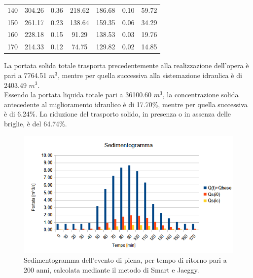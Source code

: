 \begin{table}[H]
\begin{tabular}{ccccccc}
    140      & 304.26                       & 0.36   & 218.62  & 186.68                       & 0.10   & 59.72  \\
    150      & 261.17                       & 0.23   & 138.64  & 159.35                       & 0.06   & 34.29  \\
    160      & 228.18                       & 0.15   & 91.29   & 138.53                       & 0.03   & 19.76  \\
    170      & 214.33                       & 0.12   & 74.75   & 129.82                       & 0.02   & 14.85 \\
    \bottomrule
    \end{tabular}
    \end{table}
La portata solida totale trasporta precedentemente alla realizzazione dell'opera è pari a 7764.51 $m^3$, mentre per quella successiva alla sistemazione idraulica è di 2403.49 $m^3$.\\
Essendo la portata liquida totale pari a 36100.60 $m^3$, la concentrazione solida antecedente al miglioramento idraulico è di 17.70\%, mentre per quella successiva è di 6.24\%. La riduzione del trasporto solido, in presenza o in assenza delle briglie, è del 64.74\%.\\
\begin{figure}[H] \centering
    \includegraphics[scale=0.75]{immagini/sedimentogramma_smart_jaeggy.png}
    \caption{Sedimentogramma dell'evento di piena, per tempo di ritorno pari a 200 anni, calcolata mediante il metodo di Smart e Jaeggy.}
    \label{sedimentogramma_smart_jaeggy}
\end{figure}


